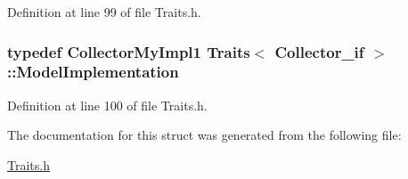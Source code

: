Definition at line 99 of file Traits.\-h.

\hypertarget{struct_traits_3_01_collector__if_01_4_a38ef8e0ef3488a361965174720a895ae}{
\subsubsection[{Model\-Implementation}]{\setlength{\rightskip}{0pt plus 5cm}typedef {\bf Collector\-My\-Impl1} {\bf Traits}$<$ {\bf Collector\-\_\-if} $>$\-::{\bf Model\-Implementation}}}\label{struct_traits_3_01_collector__if_01_4_a38ef8e0ef3488a361965174720a895ae}


Definition at line 100 of file Traits.\-h.



The documentation for this struct was generated from the following file\-:\begin{DoxyCompactItemize}
\item 
\hyperlink{_traits_8h}{Traits.\-h}\end{DoxyCompactItemize}

